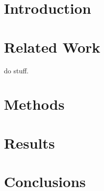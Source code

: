 \documentclass[acmtog,review]{acmart}
\begin{document}
\maketitle

\section{Introduction}

\lipsum[3]

\section{Related Work}

\citet{Tournier2015} do stuff. \lipsum[1]

\section{Methods}

\lipsum[4]

\section{Results}

\lipsum[4]

\section{Conclusions}

\lipsum[1]



\end{document}
